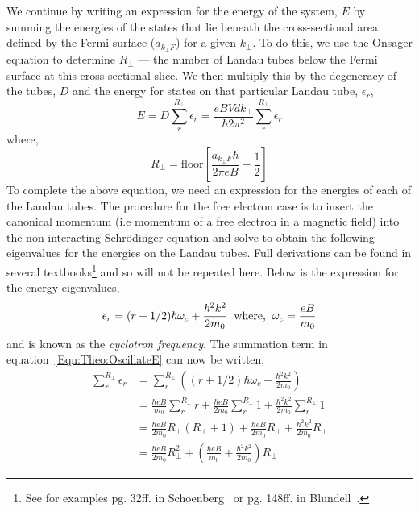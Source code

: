 We continue by writing an expression for the energy of the system, $E$ by summing the energies of the states that lie beneath the cross-sectional area defined by the Fermi surface ($a_{k_\perp F}$) for a given $k_\perp$. To do this, we use the Onsager equation to determine $R_\perp$ --- the number of Landau tubes below the Fermi surface at this cross-sectional slice. We then multiply this by the degeneracy of the tubes, $D$ and the energy for states on that particular Landau tube, $\epsilon_r$,
\begin{equation}
\label{Eqn:Theo:OscillateE}
E = D\sum_{r}^{R_\perp}\epsilon_r = \frac{eBVdk_\perp}{\hbar 2 \pi^2}\sum_{r}^{R_\perp}\epsilon_r
\end{equation}
 where,
\begin{equation}
R_\perp = \textrm{floor}\left[\frac{a_{k_\perp F}\hbar}{2\pi e B} - \frac{1}{2}\right]
\end{equation}
To complete the above equation, we need an expression for the energies of each of the Landau tubes. The procedure for the free electron case is to insert the canonical momentum (i.e momentum of a free electron in a magnetic field) into the non-interacting Schr\"odinger equation and solve to obtain the following eigenvalues for the energies on the Landau tubes. Full derivations can be found in several textbooks\footnote{See for examples pg. 32ff. in Schoenberg~\cite{Schoenberg1984} or pg. 148ff. in Blundell~\cite{Blundell2001}.} and so will  not be repeated here. Below is the expression for the energy eigenvalues,
\begin{equation}
\epsilon_r=(r+1/2) \hbar \omega_c + \frac{\hbar^2 k^2}{2m_0} \textrm{\hspace{0.2cm}where,\hspace{0.2cm}} \omega_c = \frac{eB}{m_0}
\end{equation}
and is known as the \emph{cyclotron frequency}. The summation term in equation~\ref{Eqn:Theo:OscillateE} can now be written,
\begin{align*}
\sum_r^{R_\perp}\epsilon_r &= \sum_r^{R_\perp}\left( (r+1/2) \hbar \omega_c + \frac{\hbar^2 k^2}{2m_0} \right) \\
    &= \frac{\hbar eB}{m_0}\sum_r^{R_\perp}r + \frac{\hbar eB}{2m_0}\sum_r^{R_\perp}1 + \frac{\hbar^2 k^2}{2m_0}\sum_r^{R_\perp}1 \\
    &= \frac{\hbar eB}{2 m_0} R_\perp(R_\perp + 1) + \frac{\hbar eB}{2m_0}R_\perp + \frac{\hbar^2 k^2}{2m_0}R_\perp \\
    &= \frac{\hbar eB}{2m_0}R_\perp^2 + \left(\frac{\hbar eB}{m_0} + \frac{\hbar^2 k^2}{2m_0}\right)R_\perp
\end{align*}
